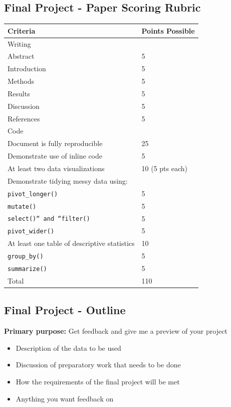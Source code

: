 \documentclass[
  letterpaper,
  DIV=11,
  numbers=noendperiod,
  oneside]{scrartcl}
\providecommand{\tightlist}{%
  \setlength{\itemsep}{0pt}\setlength{\parskip}{0pt}}\usepackage{longtable,booktabs,array}
\begin{document}
\hypertarget{final-project---paper-scoring-rubric}{%
\subsection{Final Project - Paper Scoring
Rubric}\label{final-project---paper-scoring-rubric}}

\begin{longtable*}{ll}
\toprule
Criteria & Points Possible \\ 
\midrule
Writing &  \\ 
Abstract & 5 \\ 
Introduction & 5 \\ 
Methods & 5 \\ 
Results & 5 \\ 
Discussion & 5 \\ 
References & 5 \\ 
Code &  \\ 
Document is fully reproducible & 25 \\ 
Demonstrate use of inline code & 5 \\ 
At least two data visualizations & 10 (5 pts each) \\ 
Demonstrate tidying messy data using: &  \\ 
\texttt{pivot\_longer()} & 5 \\ 
\texttt{mutate()} & 5 \\ 
\texttt{select()`` and ``filter()} & 5 \\ 
\texttt{pivot\_wider()} & 5 \\ 
At least one table of descriptive statistics & 10 \\ 
\texttt{group\_by()} & 5 \\ 
\texttt{summarize()} & 5 \\ 
Total & 110 \\ 
\bottomrule
\end{longtable*}

\hypertarget{final-project---outline}{%
\subsection{Final Project - Outline}\label{final-project---outline}}

\textbf{Primary purpose:} Get feedback and give me a preview of your
project

\begin{itemize}
\tightlist
\item
  Description of the data to be used
\item
  Discussion of preparatory work that needs to be done
\item
  How the requirements of the final project will be met
\item
  Anything you want feedback on
\end{itemize}
\end{document}
